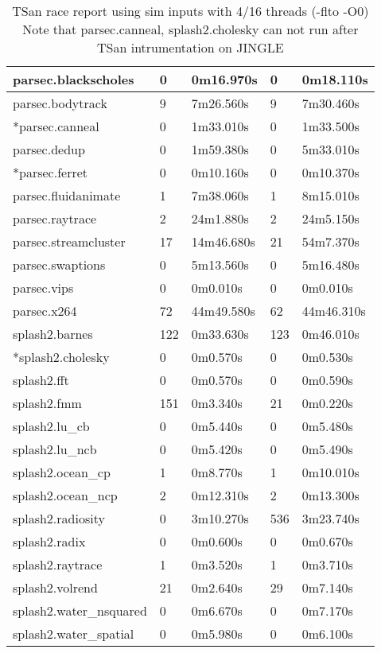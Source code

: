 \begin{table}[htbp]
{\begin{tabular}{|l|l|l|l|l|}
parsec.blackscholes	&0	&0m16.970s	&0	&0m18.110s	\\\hline
parsec.bodytrack	&9	&7m26.560s	&9	&7m30.460s	\\\hline
*parsec.canneal	&0	&1m33.010s	&0	&1m33.500s	\\\hline
parsec.dedup	&0	&1m59.380s	&0	&5m33.010s	\\\hline
*parsec.ferret	&0	&0m10.160s	&0	&0m10.370s	\\\hline
parsec.fluidanimate	&1	&7m38.060s	&1	&8m15.010s	\\\hline
parsec.raytrace	&2	&24m1.880s	&2	&24m5.150s	\\\hline
parsec.streamcluster	&17	&14m46.680s	&21	&54m7.370s	\\\hline
parsec.swaptions	&0	&5m13.560s	&0	&5m16.480s	\\\hline
parsec.vips	&0	&0m0.010s	&0	&0m0.010s	\\\hline
parsec.x264	&72	&44m49.580s	&62	&44m46.310s	\\\hline
splash2.barnes	&122	&0m33.630s	&123	&0m46.010s	\\\hline
*splash2.cholesky	&0	&0m0.570s	&0	&0m0.530s	\\\hline
splash2.fft	&0	&0m0.570s	&0	&0m0.590s	\\\hline
splash2.fmm	&151	&0m3.340s	&21	&0m0.220s	\\\hline
splash2.lu\_cb	&0	&0m5.440s	&0	&0m5.480s	\\\hline
splash2.lu\_ncb	&0	&0m5.420s	&0	&0m5.490s	\\\hline
splash2.ocean\_cp	&1	&0m8.770s	&1	&0m10.010s	\\\hline
splash2.ocean\_ncp	&2	&0m12.310s	&2	&0m13.300s	\\\hline
splash2.radiosity	&0	&3m10.270s	&536	&3m23.740s	\\\hline
splash2.radix	&0	&0m0.600s	&0	&0m0.670s	\\\hline
splash2.raytrace	&1	&0m3.520s	&1	&0m3.710s	\\\hline
splash2.volrend	&21	&0m2.640s	&29	&0m7.140s	\\\hline
splash2.water\_nsquared	&0	&0m6.670s	&0	&0m7.170s	\\\hline
splash2.water\_spatial	&0	&0m5.980s	&0	&0m6.100s	\\\hline
\end{tabular}
}
\caption{TSan race report using sim inputs with 4/16 threads (-flto -O0)
Note that \textsf{parsec.canneal, splash2.cholesky} can not run after TSan intrumentation on JINGLE
}
\end{table}



